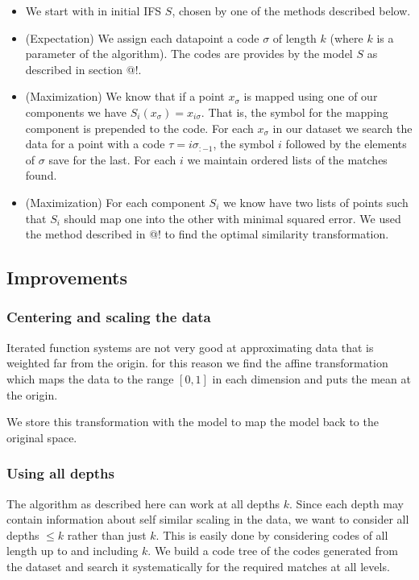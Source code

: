\documentclass[11pt]{article}
\theoremstyle{definition}
\begin{document}
\begin{itemize}
\item We start with in initial IFS $S$, chosen by one of the methods described below. 
\item (Expectation) We assign each datapoint a code $\sigma$ of length $k$ (where $k$ is a parameter of the algorithm). The codes are provides by the model $S$ as described in section @!.
\item (Maximization) We know that if a point $x_\sigma$ is mapped using one of our components we have $S_i(x_\sigma) = x_{i\sigma}$. That is, the symbol for the mapping component is prepended to the code. For each $x_\sigma$ in our dataset we search the data for a point with a code $\tau = i\sigma_{:-1}$, the symbol $i$ followed by the elements of $\sigma$ save for the last. For each $i$ we maintain ordered lists of the matches found.
\item (Maximization) For each component $S_i$ we know have two lists of points such that $S_i$ should map one into the other with minimal squared error. We used the method described in @! to find the optimal similarity transformation. 
\end{itemize}
 
\subsection{Improvements}

\subsubsection{Centering and scaling the data}

Iterated function systems are not very good at approximating data that is weighted far from the origin. for this reason we find the affine transformation which maps the data to the range $[0,1]$ in each dimension and puts the mean at the origin.

We store this transformation with the model to map the model back to the original space.

\subsubsection{Using all depths}

The algorithm as described here can work at all depths $k$. Since each depth may contain information about self similar scaling in the data, we want to consider all depths $\leq k$ rather than just $k$. This is easily done by considering codes of all length up to and including $k$. We build a code tree of the codes generated from the dataset and search it systematically for the required matches at all levels.
\end{document}
